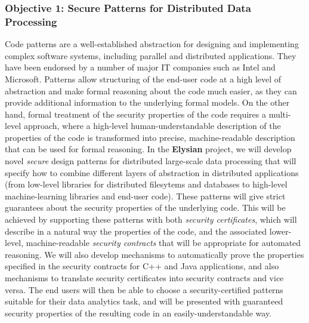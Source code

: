 \documentclass[a4paper,11pt]{article}
\newcommand{\project}[1]{\textbf{#1}\xspace}
\newcommand{\SECURITY}{\project{Elysian}}
\newcommand{\TheProject}{\SECURITY}
\begin{document}
\subsubsection*{Objective 1: Secure Patterns for Distributed Data Processing}
\vspace{-6pt}
Code patterns are a well-established abstraction for designing and implementing complex software systems, including parallel and distributed applications.  They have been endorsed by a number of major IT companies such as Intel and Microsoft. Patterns allow structuring of the end-user code at a high level of abstraction and make formal reasoning about the code much easier, as they can provide additional information to the underlying formal models. On the other hand, formal treatment of the security properties of the code requires a multi-level approach, where a high-level human-understandable description of the properties of the code is transformed into precise, machine-readable description that can be used for formal reasoning. In the \TheProject{} project, we will develop novel \emph{secure} design patterns for distributed large-scale data processing that will specify how to combine different layers of abstraction in distributed applications (from low-level libraries for distributed filesytems and databases to high-level machine-learning libraries and end-user code). These patterns will give strict guarantees about the security properties of the underlying code. This will be achieved by supporting these patterns with both \emph{security certificates}, which will describe in a natural way the properties of the code, and the associated lower-level, machine-readable \emph{security contracts} that will be appropriate for automated reasoning. We will also develop mechanisms to automatically prove the properties specified in the security contracts for C++ and Java applications, and also mechanisms to translate security certificates into security contracts and vice versa. The end users will then be able to choose a security-certified patterns suitable for their data analytics task, and will be presented with guaranteed security properties of the resulting code in an easily-understandable way. 
\end{document}
